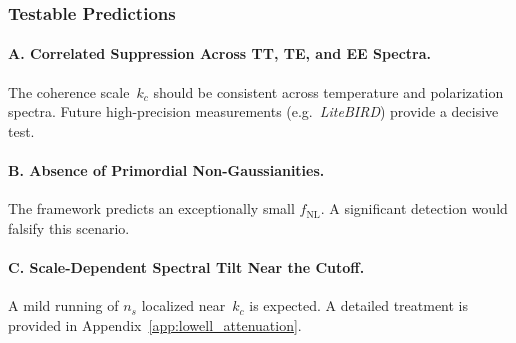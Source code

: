   \subsubsection*{Testable Predictions}

    \paragraph{A. Correlated Suppression Across TT, TE, and EE Spectra.}
      The coherence scale~$k_c$ should be consistent across temperature and
      polarization spectra.
      Future high-precision measurements (e.g.\ \textit{LiteBIRD}) provide a
      decisive test.

    \paragraph{B. Absence of Primordial Non-Gaussianities.}
      The framework predicts an exceptionally small $f_{\mathrm{NL}}$.
      A significant detection would falsify this scenario.

    \paragraph{C. Scale-Dependent Spectral Tilt Near the Cutoff.}
      A mild running of $n_s$ localized near~$k_c$ is expected.
      A detailed treatment is provided in
      Appendix~\ref{app:lowell_attenuation}.
